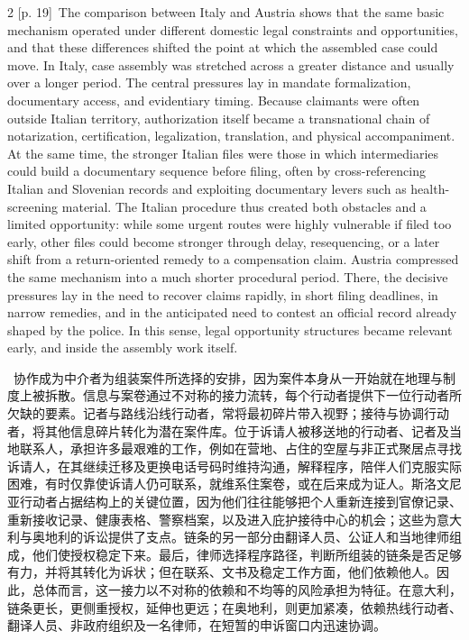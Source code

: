 \documentclass[10pt,a4paper]{article}
\begin{document}
\begin{paracol}{2}
\switchcolumn
{\scriptsize\color{gray} [p. 19]}\ The comparison between Italy and Austria shows that the same basic mechanism operated under different domestic legal constraints and opportunities, and that these differences shifted the point at which the assembled case could move. In Italy, case assembly was stretched across a greater distance and usually over a longer period. The central pressures lay in mandate formalization, documentary access, and evidentiary timing. Because claimants were often outside Italian territory, authorization itself became a transnational chain of notarization, certification, legalization, translation, and physical accompaniment. At the same time, the stronger Italian files were those in which intermediaries could build a documentary sequence before filing, often by cross-referencing Italian and Slovenian records and exploiting documentary levers such as health-screening material. The Italian procedure thus created both obstacles and a limited opportunity: while some urgent routes were highly vulnerable if filed too early, other files could become stronger through delay, resequencing, or a later shift from a return-oriented remedy to a compensation claim. Austria compressed the same mechanism into a much shorter procedural period. There, the decisive pressures lay in the need to recover claims rapidly, in short filing deadlines, in narrow remedies, and in the anticipated need to contest an official record already shaped by the police. In this sense, legal opportunity structures became relevant early, and inside the assembly work itself.\par
\switchcolumn*
{\scriptsize\color{gray} [p. 20]}\ 协作成为中介者为组装案件所选择的安排，因为案件本身从一开始就在地理与制度上被拆散。信息与案卷通过不对称的接力流转，每个行动者提供下一位行动者所欠缺的要素。记者与路线沿线行动者，常将最初碎片带入视野；接待与协调行动者，将其他信息碎片转化为潜在案件库。位于诉请人被移送地的行动者、记者及当地联系人，承担许多最艰难的工作，例如在营地、占住的空屋与非正式聚居点寻找诉请人，在其继续迁移及更换电话号码时维持沟通，解释程序，陪伴人们克服实际困难，有时仅靠使诉请人仍可联系，就维系住案卷，或在后来成为证人。斯洛文尼亚行动者占据结构上的关键位置，因为他们往往能够把个人重新连接到官僚记录、重新接收记录、健康表格、警察档案，以及进入庇护接待中心的机会；这些为意大利与奥地利的诉讼提供了支点。链条的另一部分由翻译人员、公证人和当地律师组成，他们使授权稳定下来。最后，律师选择程序路径，判断所组装的链条是否足够有力，并将其转化为诉状；但在联系、文书及稳定工作方面，他们依赖他人。因此，总体而言，这一接力以不对称的依赖和不均等的风险承担为特征。在意大利，链条更长，更侧重授权，延伸也更远；在奥地利，则更加紧凑，依赖热线行动者、翻译人员、非政府组织及一名律师，在短暂的申诉窗口内迅速协调。\par

\end{paracol}
\end{document}
